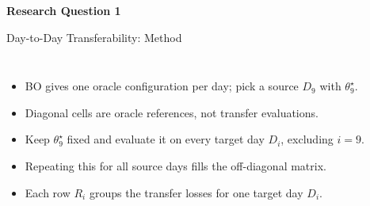 \begin{frame}[plain]
    \centering
    \vfill
    {\color{structure.fg}\large\bfseries Research Question 1}\par
    \vspace{1.15em}
    \par
    \vfill
\end{frame}

\begin{frame}{Day-to-Day Transferability: Method}
    \vspace{-0.35em}
    \begin{columns}[T,onlytextwidth]
        \scriptsize
        \begin{itemize}
            \setlength\itemsep{0.45em}
            \item<1-> BO gives one oracle configuration per day; pick a source \(D_9\) with \(\theta_9^{\star}\).
            \item<2-> Diagonal cells are oracle references, not transfer evaluations.
            \item<3-> Keep \(\theta_9^{\star}\) fixed and evaluate it on every target day \(D_i\), excluding \(i=9\).
            \item<4-> Repeating this for all source days fills the off-diagonal matrix.
            \item<5-> Each row \(R_i\) groups the transfer losses for one target day \(D_i\).
        \end{itemize}

        \centering
        
    \end{columns}
\end{frame}


